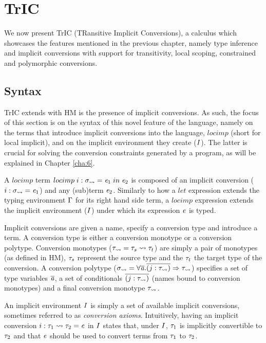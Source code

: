 \chapter{TrIC}
\label{cha:5}

We now present TrIC (TRansitive Implicit Conversions), a calculus which showcases the features mentioned in the previous chapter, namely type inference and implicit conversions with support for transitivity, local scoping, constrained and polymorphic conversions.

\section{Syntax}
TrIC extends with HM is the presence of implicit conversions. As such, the focus of this section is on the syntax of this novel feature of the language, namely on the terms that introduce implicit conversions into the language, $locimp$ (short for local implicit), and on the implicit environment they create ($I$). The latter is crucial for solving the conversion constraints generated by a program, as will be explained in Chapter \ref{cha:6}.

A $locimp$ term $locimp \; i : \mathit{\sigma}_{\rightsquigarrow}=\mathit{e}_1\; in\; \mathit{e}_2$ is composed of an implicit conversion ($i : \mathit{\sigma}_{\rightsquigarrow}=\mathit{e}_1$) and any (sub)term $\mathit{e}_2$. Similarly to how a $let$ expression extends the typing environment $\Gamma$ for its right hand side term, a $locimp$ expression extends the implicit environment ($I$) under which its expression $\mathit{e}$ is typed. 

Implicit conversions are given a name, specify a conversion type and introduce a term. A conversion type is either a conversion monotype or a conversion polytype. Conversion monotypes ($\mathit{\tau_{\rightsquigarrow}}=\mathit{\tau}_s \rightsquigarrow \mathit{\tau}_t$) are simply a pair of monotypes (as defined in HM), $\mathit{\tau}_s$ represent the source type and the $\mathit{\tau}_t$ the target type of the conversion. A conversion polytype ($\mathit{\sigma_{\rightsquigarrow}}=\forall \overline {\mathit{a}} . \overline{(j : \mathit{\tau}_{\rightsquigarrow})} \Rightarrow \mathit{\tau}_{\rightsquigarrow}$) specifies a set of type variables $\overline {\mathit{a}}$, a set of conditionals $\overline{(j : \mathit{\tau}_{\rightsquigarrow})}$ (names bound to conversion monotypes) and a final conversion monotype $\mathit{\tau}_{\rightsquigarrow}$. 

An implicit environment $I$ is simply a set of available implicit conversions, sometimes referred to as \textit{conversion axioms}. Intuitively, having an implicit conversion $i : \mathit{\tau}_1 \rightsquigarrow \mathit{\tau}_2 = \mathit{e}$ in $I$ states that, under $I$, $\mathit{\tau}_1$ is implicitly convertible to $\mathit{\tau}_2$ and that $\mathit{e}$ should be used to convert terms from $\mathit{\tau}_1$ to $\mathit{\tau}_2$.

